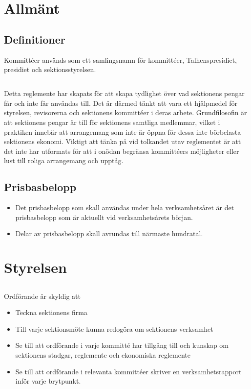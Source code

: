 \documentclass[a4paper, 10pt]{article}
\begin{document}
\newpage
\setcounter{tocdepth}{1}
\tableofcontents
\newpage

\section{Allmänt}
\subsection{Definitioner}
Kommittéer används som ett samlingsnamn för kommittéer, Talhenspresidiet, presidiet och sektionsstyrelsen.

\subsection{}
Detta reglemente har skapats för att skapa tydlighet över vad sektionens pengar får och inte får användas till. Det är därmed tänkt att vara ett hjälpmedel för styrelsen, revisorerna och sektionens kommittéer i deras arbete. Grundfilosofin är att sektionens pengar är till för sektionens samtliga medlemmar, vilket i praktiken innebär att arrangemang som inte är öppna för dessa inte börbelasta sektionens ekonomi. Viktigt att tänka på vid tolkandet utav reglementet är att det inte har utformats för att i onödan begränsa kommittéers möjligheter eller lust till roliga arrangemang och upptåg.
\subsection{Prisbasbelopp}
\begin{itemize}
  \item Det prisbasbelopp som skall användas under hela verksamhetsåret är det prisbasbelopp som är aktuellt vid verksamhetsårets början.
  \item Delar av prisbasbelopp skall avrundas till närmaste hundratal. 
\end{itemize}
\section{Styrelsen}
\subsection{}
Ordförande är skyldig att
\begin{itemize}
  \item Teckna sektionens firma
  \item Till varje sektionsmöte kunna redogöra om sektionens verksamhet
  \item Se till att ordförande i varje kommitté har tillgång till och kunskap om sektionens stadgar, reglemente och ekonomiska reglemente
  \item Se till att ordförande i relevanta kommittéer skriver en verksamhetsrapport inför varje brytpunkt.
\end{itemize}
\end{document}

